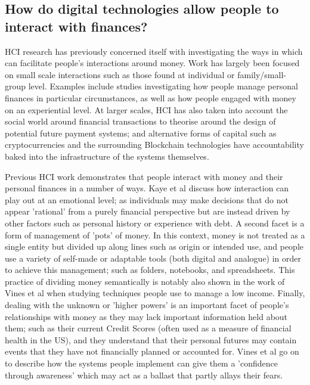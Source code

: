 \subsection{How do digital technologies allow people to interact with finances?}%
HCI research has previously concerned itself with investigating the ways in which can facilitate people's interactions around money. Work has largely been focused on small scale interactions such as those found at individual or family/small-group level. Examples include studies investigating how people manage personal finances in particular circumstances, as well as how people engaged with money on an experiential level. At larger scales, HCI has also taken into account the social world around financial transactions to theorise around the design of potential future payment systems; and alternative forms of capital such as cryptocurrencies and the surrounding Blockchain technologies have accountability baked into the infrastructure of the systems themselves.
%

Previous HCI work demonstrates that people interact with money and their personal finances in a number of ways. Kaye et al discuss how interaction can play out at an emotional level; as individuals may make decisions that do not appear 'rational' from a purely financial perspective but are instead driven by other factors such as personal history or experience with debt. A second facet is a form of management of 'pots' of money. In this context, money is not treated as a single entity but divided up along lines such as origin or intended use, and people use a variety of self-made or adaptable tools (both digital and analogue) in order to achieve this management; such as folders, notebooks, and spreadsheets. This practice of dividing money semantically is notably also shown in the work of Vines et al when studying techniques people use to manage a low income. Finally, dealing with the unknown or 'higher powers' is an important facet of people's relationships with money as they may lack important information held about them; such as their current Credit Scores (often used as a measure of financial health in the US), and they understand that their personal futures may contain events that they have not financially planned or accounted for. Vines et al go on to describe how the systems people implement can give them a 'confidence through awareness' which may act as a ballast that partly allays their fears.



